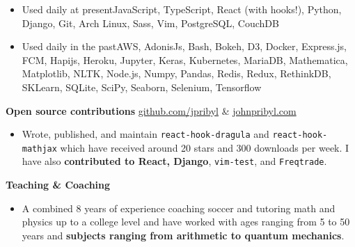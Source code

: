 \documentclass[11pt]{resume}
\begin{document}
\begin{minipage}[t]{1\textwidth}
\begin{addmargin}[.5em]{0em}
\begin{itemize}
          \item {Used daily at present\textemdash JavaScript,
                TypeScript, React (with hooks!), Python, Django, Git, Arch Linux,
                Sass, Vim, PostgreSQL, CouchDB}

          \item {Used daily in the past\textemdash AWS, AdonisJs, Bash, Bokeh,
              D3, Docker, Express.js, FCM, Hapijs, Heroku, Jupyter, Keras,
              Kubernetes, MariaDB, Mathematica, Matplotlib, NLTK, Node.js,
              Numpy, Pandas, Redis, Redux, RethinkDB, SKLearn, SQLite, SciPy, Seaborn,
              Selenium, Tensorflow}
        \end{itemize}
      \end{addmargin}

      \vspace{.5em}

      {\bf Open source contributions\textemdash \hspace{.5em}} \textcolor{lavender}{\faGithub\hspace{.5em}\underline{\href{http://www.github.com/jpribyl}{github.com/jpribyl}}} \hspace{.5em} \& \hspace{.5em} \textcolor{lavender}{\faGlobe\hspace{.5em}\underline{\href{http://www.johnpribyl.com}{johnpribyl.com}}}
      \vspace{.5em}
      \begin{addmargin}[.5em]{0em}
        \begin{itemize}
          \setlength\itemsep{-.2em}
          \item {Wrote, published, and maintain \verb|react-hook-dragula| and
              \verb|react-hook-mathjax| which have received around 20 stars and
              300 downloads per week. I have also {\bf contributed to React,
              Django}, \verb|vim-test|, and \verb|Freqtrade|.}
        \end{itemize}
      \end{addmargin}

      \vspace{.5em}
      {\bf Teaching \& Coaching}
      \vspace{.5em}
      \begin{addmargin}[.5em]{0em}
        \begin{itemize}
          \setlength\itemsep{-.2em}
          \item {A combined 8 years of experience coaching soccer and
                tutoring math and physics up to a college level and have worked with ages
              ranging from 5 to 50 years and {\bf subjects ranging from arithmetic to quantum mechanics}.}
        \end{itemize}
      \end{addmargin}


\end{minipage}
\end{document}
